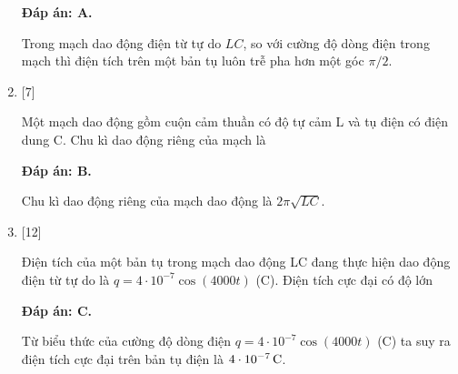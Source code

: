\begin{enumerate}[label=\bfseries Câu \arabic*:]
	\loigiai
	{		\textbf{Đáp án: A.}
		
		Trong mạch dao động điện từ tự do $LC$, so với cường độ dòng điện trong mạch thì điện tích trên một bản tụ luôn trễ pha hơn một góc $\pi/2$.
		
	}

	\item {} [7]
	
	\cauhoi
	{Một mạch dao động gồm cuộn cảm thuần có độ tự cảm L và tụ điện có điện dung C. Chu kì dao động riêng của mạch là
	}
	
	\loigiai
	{		\textbf{Đáp án: B.}
		
		Chu kì dao động riêng của mạch dao động là $2\pi \sqrt{LC}$.
		
	}	

	\item {} [12]
	
	\cauhoi
	{Điện tích của một bản tụ trong mạch dao động LC đang thực hiện dao động điện từ tự do là $q = 4\cdot10^{-7} \cos \left( 4000t \right)$ (C). Điện tích cực đại có độ lớn
	}
	
	\loigiai
	{		\textbf{Đáp án: C.}
		
		Từ biểu thức của cường độ dòng điện $q = 4\cdot10^{-7} \cos \left( 4000t \right)$ (C) ta suy ra điện tích cực đại trên bản tụ điện là $\xsi{4\cdot10^{-7}}{C}$.
		
}
\end{enumerate}
